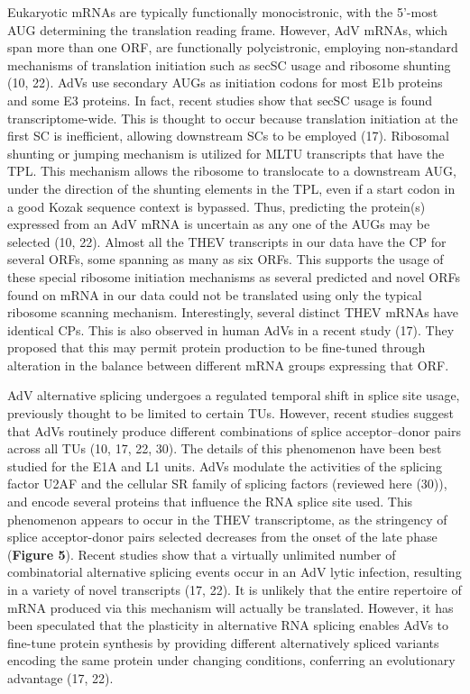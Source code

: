 \documentclass[
]{article}
\begin{document}
Eukaryotic mRNAs are typically functionally monocistronic, with the
5'-most AUG determining the translation reading frame. However, AdV
mRNAs, which span more than one ORF, are functionally polycistronic,
employing non-standard mechanisms of translation initiation such as
secSC usage and ribosome shunting (10, 22). AdVs use secondary AUGs as
initiation codons for most E1b proteins and some E3 proteins. In fact,
recent studies show that secSC usage is found transcriptome-wide. This
is thought to occur because translation initiation at the first SC is
inefficient, allowing downstream SCs to be employed (17). Ribosomal
shunting or jumping mechanism is utilized for MLTU transcripts that have
the TPL. This mechanism allows the ribosome to translocate to a
downstream AUG, under the direction of the shunting elements in the TPL,
even if a start codon in a good Kozak sequence context is bypassed.
Thus, predicting the protein(s) expressed from an AdV mRNA is uncertain
as any one of the AUGs may be selected (10, 22). Almost all the THEV
transcripts in our data have the CP for several ORFs, some spanning as
many as six ORFs. This supports the usage of these special ribosome
initiation mechanisms as several predicted and novel ORFs found on mRNA
in our data could not be translated using only the typical ribosome
scanning mechanism. Interestingly, several distinct THEV mRNAs have
identical CPs. This is also observed in human AdVs in a recent study
(17). They proposed that this may permit protein production to be
fine-tuned through alteration in the balance between different mRNA
groups expressing that ORF.

AdV alternative splicing undergoes a regulated temporal shift in splice
site usage, previously thought to be limited to certain TUs. However,
recent studies suggest that AdVs routinely produce different
combinations of splice acceptor--donor pairs across all TUs (10, 17, 22,
30). The details of this phenomenon have been best studied for the E1A
and L1 units. AdVs modulate the activities of the splicing factor U2AF
and the cellular SR family of splicing factors (reviewed here (30)), and
encode several proteins that influence the RNA splice site used. This
phenomenon appears to occur in the THEV transcriptome, as the stringency
of splice acceptor-donor pairs selected decreases from the onset of the
late phase (\textbf{Figure 5}). Recent studies show that a virtually
unlimited number of combinatorial alternative splicing events occur in
an AdV lytic infection, resulting in a variety of novel transcripts (17,
22). It is unlikely that the entire repertoire of mRNA produced via this
mechanism will actually be translated. However, it has been speculated
that the plasticity in alternative RNA splicing enables AdVs to
fine-tune protein synthesis by providing different alternatively spliced
variants encoding the same protein under changing conditions, conferring
an evolutionary advantage (17, 22).
\end{document}
